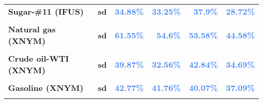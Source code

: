 \documentclass[
  authoryear,
  preprint,
  3p]{elsarticle}
\begin{document}
\begin{longtable}[t]{>{}l>{}l>{}r>{}r>{}r>{}r}
\textbf{Sugar-\#11 (IFUS)} & \textbf{sd} & \textcolor[HTML]{4285f4}{\textbf{34.88\%}} & \textcolor[HTML]{4285f4}{\textbf{33.25\%}} & \textcolor[HTML]{4285f4}{\textbf{37.9\%}} & \textcolor[HTML]{4285f4}{\textbf{28.72\%}}\\
\addlinespace
\textbf{\cellcolor{gray!10}{Natural gas (XNYM)}} & \textbf{\cellcolor{gray!10}{mean}} & \textcolor[HTML]{4285f4}{\textbf{\cellcolor{gray!10}{35.38\%}}} & \textcolor[HTML]{4285f4}{\textbf{\cellcolor{gray!10}{16.25\%}}} & \textcolor[HTML]{4285f4}{\textbf{\cellcolor{gray!10}{0.93\%}}} & \textcolor[HTML]{4285f4}{\textbf{\cellcolor{gray!10}{8.33\%}}}\\
\textbf{Natural gas (XNYM)} & \textbf{sd} & \textcolor[HTML]{4285f4}{\textbf{61.55\%}} & \textcolor[HTML]{4285f4}{\textbf{54.6\%}} & \textcolor[HTML]{4285f4}{\textbf{53.58\%}} & \textcolor[HTML]{4285f4}{\textbf{44.58\%}}\\
\textbf{\cellcolor{gray!10}{Crude oil-WTI (XNYM)}} & \textbf{\cellcolor{gray!10}{mean}} & \textcolor[HTML]{4285f4}{\textbf{\cellcolor{gray!10}{15.43\%}}} & \textcolor[HTML]{4285f4}{\textbf{\cellcolor{gray!10}{*28.74\%}}} & \textcolor[HTML]{4285f4}{\textbf{\cellcolor{gray!10}{9.67\%}}} & \textcolor[HTML]{4285f4}{\textbf{\cellcolor{gray!10}{-5.64\%}}}\\
\textbf{Crude oil-WTI (XNYM)} & \textbf{sd} & \textcolor[HTML]{4285f4}{\textbf{39.87\%}} & \textcolor[HTML]{4285f4}{\textbf{32.56\%}} & \textcolor[HTML]{4285f4}{\textbf{42.84\%}} & \textcolor[HTML]{4285f4}{\textbf{34.69\%}}\\
\textbf{\cellcolor{gray!10}{Gasoline (XNYM)}} & \textbf{\cellcolor{gray!10}{mean}} & \textcolor[HTML]{4285f4}{\textbf{\cellcolor{gray!10}{16.65\%}}} & \textcolor[HTML]{4285f4}{\textbf{\cellcolor{gray!10}{30.95\%}}} & \textcolor[HTML]{4285f4}{\textbf{\cellcolor{gray!10}{10.59\%}}} & \textcolor[HTML]{4285f4}{\textbf{\cellcolor{gray!10}{-5.37\%}}}\\
\addlinespace
\textbf{Gasoline (XNYM)} & \textbf{sd} & \textcolor[HTML]{4285f4}{\textbf{42.77\%}} & \textcolor[HTML]{4285f4}{\textbf{41.76\%}} & \textcolor[HTML]{4285f4}{\textbf{40.07\%}} & \textcolor[HTML]{4285f4}{\textbf{37.09\%}}\\
\textbf{\cellcolor{gray!10}{Heating oil (XNYM)}} & \textbf{\cellcolor{gray!10}{mean}} & \textcolor[HTML]{4285f4}{\textbf{\cellcolor{gray!10}{16.31\%}}} & \textcolor[HTML]{4285f4}{\textbf{\cellcolor{gray!10}{*29.88\%}}} & \textcolor[HTML]{4285f4}{\textbf{\cellcolor{gray!10}{6.83\%}}} & \textcolor[HTML]{4285f4}{\textbf{\cellcolor{gray!10}{-3.44\%}}}\\

\end{longtable}
\end{document}
